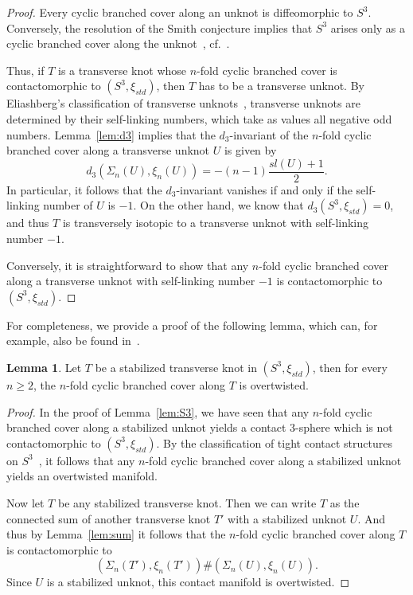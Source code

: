 \documentclass[11pt]{amsart}
\theoremstyle{definition}
\theoremstyle{definition}
\theoremstyle{definition}
\theoremstyle{definition}
\newtheorem{lemma}[theorem]{Lemma}
\begin{document}
\begin{proof}
Every cyclic branched cover along an unknot is diffeomorphic to $S^3$. Conversely, the resolution of the Smith conjecture implies that $S^3$ arises only as a cyclic branched cover along the unknot~\cite{Zimmermann}, cf.\ \cite{Paoluzzi_survey}.

Thus, if $T$ is a transverse knot whose $n$-fold cyclic branched cover is contactomorphic to $(S^3,\xi_{std})$, then $T$ has to be a transverse unknot. By Eliashberg's classification of transverse unknots~\cite{Eliashberg_transverse_unknots}, transverse unknots are determined by their self-linking numbers, which take as values all negative odd numbers. 
Lemma~\ref{lem:d3} implies that the $d_3$-invariant of the $n$-fold cyclic branched cover along a transverse unknot $U$ is given by
\begin{equation*}
    d_3(\Sigma_n(U),\xi_n(U))=-(n-1) \frac{sl(U)+1}{2}.
\end{equation*}
In particular, it follows that the $d_3$-invariant vanishes if and only if the self-linking number of $U$ is $-1$. On the other hand, we know that $d_3(S^3,\xi_{std})=0$, and thus $T$ is transversely isotopic to a transverse unknot with self-linking number $-1$.

Conversely, it is straightforward to show that any $n$-fold cyclic branched cover along a transverse unknot with self-linking number $-1$ is contactomorphic to $(S^3,\xi_{std})$.
\end{proof}

For completeness, we provide a proof of the following lemma, which can, for example, also be found in~\cite{Harvey_br_covers}.

\begin{lemma}\label{lem:stabilized}
    Let $T$ be a stabilized transverse knot in $(S^3,\xi_{std})$, then for every $n\geq2$, the $n$-fold cyclic branched cover along $T$ is overtwisted.
\end{lemma}

\begin{proof}
    In the proof of Lemma~\ref{lem:S3}, we have seen that any $n$-fold cyclic branched cover along a stabilized unknot yields a contact $3$-sphere which is not contactomorphic to $(S^3,\xi_{std})$. By the classification of tight contact structures on $S^3$~\cite{Eliashberg-20years}, it follows that any $n$-fold cyclic branched cover along a stabilized unknot yields an overtwisted manifold. 

    Now let $T$ be any stabilized transverse knot. Then we can write $T$ as the connected sum of another transverse knot $T'$ with a stabilized unknot $U$. And thus by Lemma~\ref{lem:sum} it follows that the $n$-fold cyclic branched cover along $T$ is contactomorphic to
    \begin{equation*}
        (\Sigma_n(T'),\xi_n(T'))\# (\Sigma_n(U),\xi_n(U)).
    \end{equation*}
    Since $U$ is a stabilized unknot, this contact manifold is overtwisted.
\end{proof}
\end{document}
